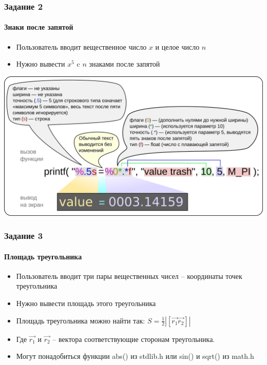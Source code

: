 \documentclass[12pt,pdf,hyperref={unicode}]{beamer}
\begin{document}
\begin{frame}
\frametitle{Задание 2} 
\framesubtitle{Знаки после запятой} 
\begin{center}
\begin{itemize}
\item Пользователь вводит вещественное число $x$ и целое число $n$ \\
\item Нужно вывести $x^5$ c $n$ знаками после запятой\\
\end{itemize}
\end{center}
\begin{center}
\includegraphics[scale=0.5]{Printf_illustration.png}
\end{center}
\end{frame}

\begin{frame}
\frametitle{Задание 3} 
\framesubtitle{Площадь треугольника} 
\begin{center}
\begin{itemize}
\item Пользователь вводит три пары вещественных чисел -- координаты точек треугольника\\
\item Нужно вывести площадь этого треугольника\\
\item Площадь треугольника можно найти так: $S = \frac{1}{2}|[\vec{r_1} \vec{r_2}]|$\\
\item Где $\vec{r_1}$ и $\vec{r_2}$ -- вектора соответствующие сторонам треугольника.
\item Могут понадобиться функции abs() из stdlib.h или sin() и sqrt() из math.h
\end{itemize}
\end{center}
\end{frame}
\end{document}

